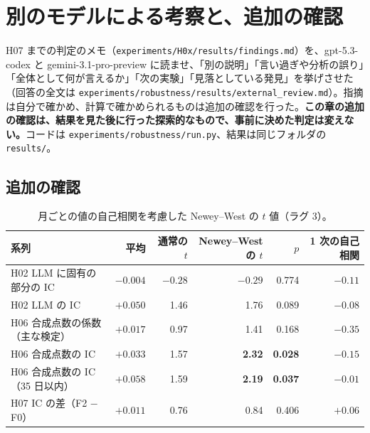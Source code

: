 \documentclass[xelatex,ja=standard,jafont=haranoaji,a4paper,10pt,openany]{bxjsreport}
\newcommand{\code}[1]{\texttt{#1}}
\begin{document}
\chapter{別のモデルによる考察と、追加の確認}\label{ch:review}

H07 までの判定のメモ（\code{experiments/H0x/results/findings.md}）を、gpt-5.3-codex と gemini-3.1-pro-preview に読ませ、「別の説明」「言い過ぎや分析の誤り」「全体として何が言えるか」「次の実験」「見落としている発見」を挙げさせた（回答の全文は \code{experiments/robustness/results/external\_review.md}）。指摘は自分で確かめ、計算で確かめられるものは追加の確認を行った。\textbf{この章の追加の確認は、結果を見た後に行った探索的なもので、事前に決めた判定は変えない。}コードは \code{experiments/robustness/run.py}、結果は同じフォルダの \code{results/}。

\section{追加の確認}

\begin{table}[htbp]
\centering
\caption{月ごとの値の自己相関を考慮した Newey--West の $t$ 値（ラグ 3）。}
\label{tab:nw}
\small
\begin{tabular}{lrrrrr}
\toprule
系列 & 平均 & 通常の $t$ & Newey--West の $t$ & $p$ & 1 次の自己相関 \\
\midrule
H02 LLM に固有の部分の IC & $-0.004$ & $-0.28$ & $-0.29$ & 0.774 & $-0.11$ \\
H02 LLM の IC & $+0.050$ & 1.46 & 1.76 & 0.089 & $-0.08$ \\
H06 合成点数の係数（主な検定） & $+0.017$ & 0.97 & 1.41 & 0.168 & $-0.35$ \\
H06 合成点数の IC & $+0.033$ & 1.57 & \textbf{2.32} & \textbf{0.028} & $-0.15$ \\
H06 合成点数の IC（35 日以内） & $+0.058$ & 1.59 & \textbf{2.19} & \textbf{0.037} & $-0.01$ \\
H07 IC の差（F2 $-$ F0） & $+0.011$ & 0.76 & 0.84 & 0.406 & $+0.06$ \\
\bottomrule
\end{tabular}
\end{table}
\end{document}
